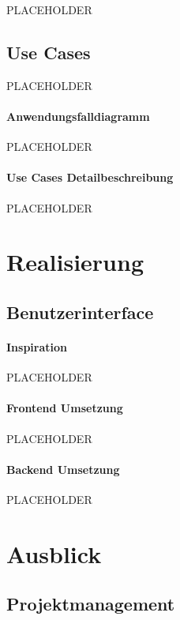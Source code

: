 PLACEHOLDER

\subsection{Use Cases}
\label{sec:org965b415}

PLACEHOLDER

\paragraph{Anwendungsfalldiagramm}
\label{sec:org92e0194}

PLACEHOLDER

\paragraph{Use Cases Detailbeschreibung}
\label{sec:org76d468c}

PLACEHOLDER

\section{Realisierung}
\label{sec:org4ce6199}
\subsection{Benutzerinterface}
\label{sec:org55de277}
\paragraph{Inspiration}
\label{sec:orgdbc0d9f}

PLACEHOLDER

\paragraph{Frontend Umsetzung}
\label{sec:org60a9be2}

PLACEHOLDER

\paragraph{Backend Umsetzung}
\label{sec:orgbd3aeee}

PLACEHOLDER

\section{Ausblick}
\label{sec:org8bd82c3}
\subsection{Projektmanagement}
\label{sec:org39784a5}

